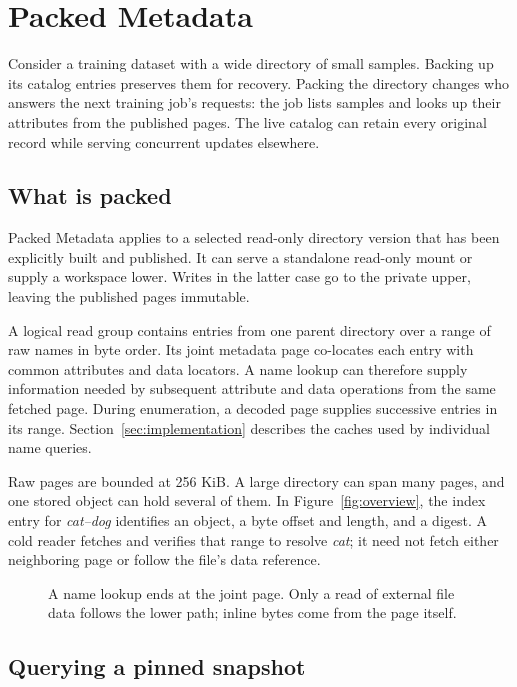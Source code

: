 \section{Packed Metadata}
\label{sec:packed}

Consider a training dataset with a wide directory of small samples.
Backing up its catalog entries preserves them for recovery. Packing the
directory changes who answers the next training job's requests: the
job lists samples and looks up their attributes from the published pages.
The live catalog can retain every original record while serving
concurrent updates elsewhere.

\subsection{What is packed}

Packed Metadata applies to a selected read-only directory version that
has been explicitly built and published. It can serve a standalone
read-only mount or supply a workspace lower. Writes in the latter case
go to the private upper, leaving the published pages immutable.

A logical read group contains entries from one parent directory over
a range of raw names in byte order. Its joint metadata page co-locates
each entry with common attributes and data locators. A name lookup can
therefore supply information needed by subsequent attribute and data
operations from the same fetched page. During enumeration, a decoded
page supplies successive entries in its range. Section~\ref{sec:implementation}
describes the caches used by individual name queries.

Raw pages are bounded at 256 KiB. A large directory can span many pages,
and one stored object can hold several of them. In
Figure~\ref{fig:overview}, the index entry for \emph{cat--dog} identifies
an object, a byte offset and length, and a digest. A cold reader fetches
and verifies that range to resolve \emph{cat}; it need not fetch either
neighboring page or follow the file's data reference.

\begin{figure}[t]
\centering

\caption{A name lookup ends at the joint page. Only a read of external
file data follows the lower path; inline bytes come from the page itself.}
\label{fig:packed}
\end{figure}

\subsection{Querying a pinned snapshot}

